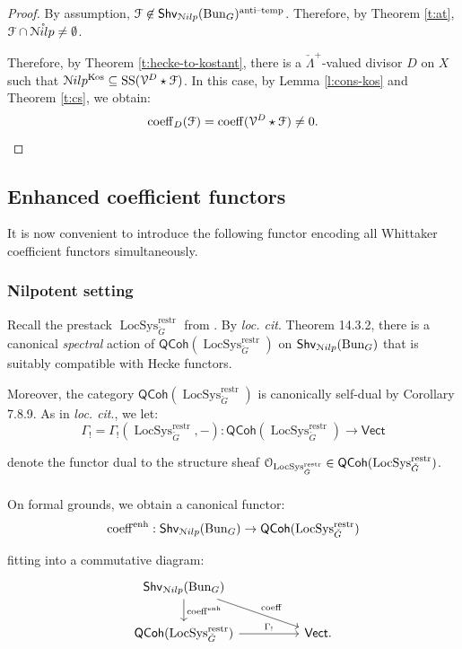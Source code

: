 \documentclass[reqno,11pt]{amsart}
\numberwithin{equation}{subsection}
\theoremstyle{remark}
\newcommand{\sF}{{\EuScript F}}
\newcommand{\sN}{{\EuScript N}}
\newcommand{\sO}{{\EuScript O}}
\newcommand{\sV}{{\EuScript V}}
\newcommand{\on}{\operatorname}
\newcommand{\mathendash}{\text{\textendash}}
\newcommand{\Vect}{\mathsf{Vect}}
\newcommand{\Bun}{\on{Bun}}
\newcommand{\LocSys}{\on{LocSys}}
\newcommand{\QCoh}{\mathsf{QCoh}}
\renewcommand{\o}[1]{\mathring{#1}}
\renewcommand{\subset}{\subseteq}
\newcommand{\coeff}{\on{coeff}}
\newcommand{\enh}{\on{enh}}
\newcommand{\Shv}{\mathsf{Shv}}
\newcommand{\at}{\on{anti}\!\mathendash\!\on{temp}}
\newcommand{\Nilp}{\sN ilp}
\newcommand{\Kos}{\on{Kos}}
\renewcommand{\SS}{\on{SS}}
\begin{document}
\begin{proof}

By assumption, $\sF \not\in \Shv_{\Nilp}(\Bun_G)^{\at}$.
Therefore, by Theorem \ref{t:at},
$\sF \cap \o{\Nilp} \neq \emptyset$.

Therefore, by Theorem \ref{t:hecke-to-kostant}, there is 
a $\check{\Lambda}^+$-valued divisor $D$ on $X$ such that
$\Nilp^{\Kos} \subset \SS(\sV^D \star \sF)$.
In this case, by Lemma \ref{l:cons-kos} and 
Theorem \ref{t:cs}, we obtain:
%
\[
\coeff_D(\sF) = \coeff(\sV^D \star \sF) \neq 0.
\]

\end{proof}

\subsection{Enhanced coefficient functors}\label{ss:coeff-enh}

It is now convenient to introduce the following functor encoding
all Whittaker coefficient functors simultaneously. 

\subsubsection{Nilpotent setting}

Recall the prestack $\LocSys_{\check{G}}^{\on{restr}}$ from \cite{agkrrv1}.
By \emph{loc. cit}. Theorem 14.3.2, there is a canonical \emph{spectral} action 
of $\QCoh(\LocSys_{\check{G}}^{\on{restr}})$ on $\Shv_{\Nilp}(\Bun_G)$
that is suitably compatible with Hecke functors.

Moreover, the category $\QCoh(\LocSys_{\check{G}}^{\on{restr}})$ is
canonically self-dual by \cite{agkrrv1} Corollary 7.8.9.
As in \emph{loc. cit}., we let:
%
\[
\Gamma_! = \Gamma_!(\LocSys_{\check{G}}^{\on{restr}},-):\QCoh(\LocSys_{\check{G}}^{\on{restr}})
\to \Vect
\]

\noindent denote the functor dual to the structure sheaf
$\sO_{\LocSys_{\check{G}}^{\on{restr}}} \in \QCoh(\LocSys_{\check{G}}^{\on{restr}})$.

\subsubsection{}\label{sss:shv-nilp-coeff-enh}

On formal grounds, we obtain a canonical functor:
%
\[
\coeff^{\enh}:\Shv_{\Nilp}(\Bun_G) \to \QCoh(\LocSys_{\check{G}}^{\on{restr}})
\]

\noindent fitting into a commutative diagram:
%
\begin{equation}\label{eq:coeff-enh}
\begin{tikzcd}
\Shv_{\Nilp}(\Bun_G)
\arrow[d,"\coeff^{\enh}"]
\arrow[drr,"\coeff"]
\\
\QCoh(\LocSys_{\check{G}}^{\on{restr}})
\arrow[rr,"\Gamma_!"]
&&
\Vect.
\end{tikzcd}
\end{equation}
\end{document}
